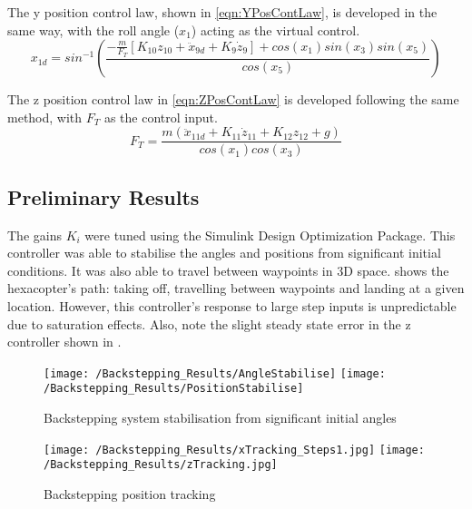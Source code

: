 The y position control law, shown in \eqref{eqn:YPosContLaw}, is developed in the same way, with the roll angle ($x_{1}$) acting as the virtual control. 
\begin{equation}\label{eqn:YPosContLaw}
x_{1d}=sin^{-1}\left(\frac{-\frac{m}{F_{T}}[K_{10}z_{10}+\ddot{x}_{9d}+K_{9}\dot{z}_{9}]+cos(x_{1})sin(x_{3})sin(x_{5})}{cos(x_{5})}\right)
\end{equation}
 
The z position control law in \eqref{eqn:ZPosContLaw} is developed following the same method, with $F_{T}$ as the control input.
\begin{equation}\label{eqn:ZPosContLaw}
F_{T}=\frac{m(\ddot{x}_{11d}+K_{11}\dot{z}_{11}+K_{12}z_{12}+g)}{cos(x_{1})cos(x_{3})}
\end{equation}

\subsection{Preliminary Results}
 
The gains $K_{i}$ were tuned using the Simulink Design Optimization Package. This controller was able to stabilise the angles and positions from significant initial conditions. It was also able to travel between waypoints in 3D space.  shows the hexacopter's path: taking off, travelling between waypoints and landing at a given location. However, this controller's response to large step inputs is unpredictable due to saturation effects. Also, note the slight steady state error in the z controller shown in .

\begin{figure}[htb]
\begin{center}
	\texttt{[image: /Backstepping\_Results/AngleStabilise]}
	\texttt{[image: /Backstepping\_Results/PositionStabilise]}%
	\end{center}
	\caption{Backstepping system stabilisation from significant initial angles}%
	\label{fig:Backstepping_Stabilise}%
\end{figure}

\begin{figure}[htb]
\begin{center}
	\texttt{[image: /Backstepping\_Results/xTracking\_Steps1.jpg]}%
	\texttt{[image: /Backstepping\_Results/zTracking.jpg]}%
	\end{center}
	\caption{Backstepping position tracking}%
	\label{fig:Backstep_posTrack}%
\end{figure}

